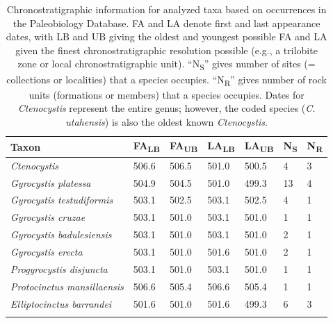 \documentclass{article}
\begin{document}
\begin{table}[]
\caption{Chronostratigraphic information for analyzed taxa based on occurrences in the Paleobiology Database.  FA and LA denote first and last appearance dates, with LB and UB giving the oldest and youngest possible FA and LA given the finest chronostratigraphic resolution possible (e.g., a trilobite zone or local chronostratigraphic unit). “N\textsubscript{S}” gives number of sites (= collections or localities) that a species occupies.  “N\textsubscript{R}” gives number of rock units (formations or members) that a species occupies. Dates for \textit{Ctenocystis} represent the entire genus; however, the coded species (\textit{C. utahensis}) is also the oldest known \textit{Ctenocystis}.} 
\begin{tabular}{l|llllll}
\rowcolor[HTML]{C0C0C0} 
Taxon                                                 & FA\textsubscript{LB}  & FA\textsubscript{UB}  & LA\textsubscript{LB}  & LA\textsubscript{UB}  & N\textsubscript{S} & N\textsubscript{R} \\ \hline
\textit{Ctenocystis}                 & 506.6 & 506.5 & 501.0 & 500.5 & 4  & 3  \\
\rowcolor[HTML]{C0C0C0} 
\textit{Gyrocystis platessa}         & 504.9 & 504.5 & 501.0 & 499.3 & 13 & 4  \\
\textit{Gyrocystis testudiformis}    & 503.1 & 502.5 & 503.1 & 502.5 & 4  & 1  \\
\rowcolor[HTML]{C0C0C0} 
\textit{Gyrocystis cruzae}           & 503.1 & 501.0 & 503.1 & 501.0 & 1  & 1  \\
\textit{Gyrocystis badulesiensis}    & 503.1 & 501.0 & 503.1 & 501.0 & 2  & 1  \\
\rowcolor[HTML]{C0C0C0} 

\textit{Gyrocystis erecta}           & 503.1 & 501.0 & 501.6 & 501.0 & 2  & 1  \\
\textit{Progyrocystis disjuncta}     & 503.1 & 501.0 & 503.1 & 501.0 & 1  & 1  \\
\rowcolor[HTML]{C0C0C0} 
\textit{Protocinctus mansillaensis}  & 506.6 & 505.4 & 506.6 & 505.4 & 1  & 1  \\
\textit{Elliptocinctus barrandei}    & 501.6 & 501.0 & 501.6 & 499.3 & 6  & 3  \\
\rowcolor[HTML]{C0C0C0} 


\end{tabular}
\end{table}
\end{document}
